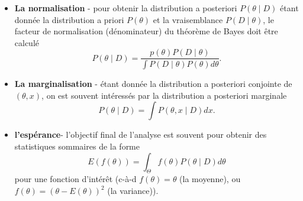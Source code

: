\begin{itemize}
	\item \textbf{La normalisation} - pour obtenir la distribution a posteriori $P(\theta \mid  D)$ \'etant donn\'ee la distribution a priori $P(\theta)$ et la vraisemblance $P(D\mid \theta)$, le facteur de normalisation (d\'enominateur) du th\'eor\`eme de Bayes doit être calcul\'e
	$$P(\theta \mid  D) = \frac{p(\theta)  P(D\mid \theta)}{\int P(D\mid \theta) P(\theta) d\theta}. $$

  \item \textbf{La marginalisation} - \'etant donn\'ee la distribution a posteriori conjointe de $(\theta,x)$, on est souvent int\'eress\'es par la distribution a posteriori marginale
	$$ P(\theta\mid D) = \int P(\theta,x\mid D) dx.$$
	
	\item \textbf{l'esp\'erance}- l'objectif final de l'analyse est souvent pour obtenir des statistiques sommaires de la forme 
	       $$ E(f(\theta)) = \int_{\Theta} f(\theta) P(\theta\mid D) d\theta $$
				pour une fonction d'int\'erêt (c-\`a-d $f(\theta) =\theta$ (la moyenne), ou $f(\theta) = (\theta-E(\theta))^{2}$ (la variance)). 
\end{itemize}

